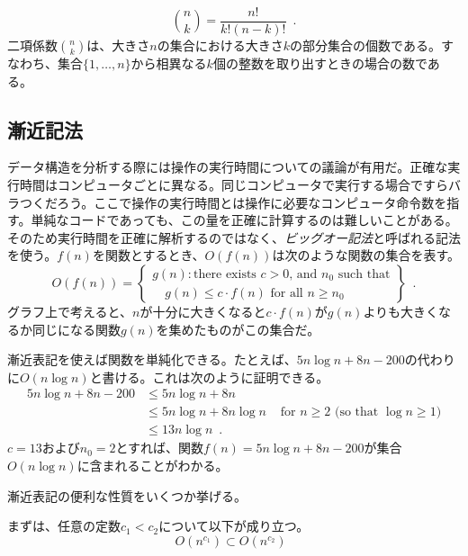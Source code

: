 \[
   \binom{n}{k} = \frac{n!}{k!(n-k)!} \enspace .
\]
二項係数$\binom{n}{k}$は、大きさ$n$の集合における大きさ$k$の部分集合の個数である。すなわち、集合$\{1,\ldots,n\}$から相異なる$k$個の整数を取り出すときの場合の数である。 %

\subsection{漸近記法}

  
データ構造を分析する際には操作の実行時間についての議論が有用だ。正確な実行時間はコンピュータごとに異なる。同じコンピュータで実行する場合ですらバラつくだろう。ここで操作の実行時間とは操作に必要なコンピュータ命令数を指す。単純なコードであっても、この量を正確に計算するのは難しいことがある。そのため実行時間を正確に解析するのではなく、\emph{ビッグオー記法}と呼ばれる記法を使う。$f(n)$を関数とするとき、$O(f(n))$は次のような関数の集合を表す。
\[
   O(f(n)) = \left\{
     \begin{array}{l}
       g(n):\mbox{there exists $c>0$, and $n_0$ such that} \\
             \quad\mbox{$g(n) \le c\cdot f(n)$ for all $n\ge n_0$}
     \end{array} \right\} \enspace .
\]
グラフ上で考えると、$n$が十分に大きくなると$c\cdot f(n)$が$g(n)$よりも大きくなるか同じになる関数$g(n)$を集めたものがこの集合だ。 %

漸近表記を使えば関数を単純化できる。たとえば、$5n\log n + 8n - 200$の代わりに$O(n \log n)$と書ける。これは次のように証明できる。
\begin{align*} 
       5n\log n + 8n - 200
        & \le 5n\log n + 8n \\
        & \le 5n\log n + 8n\log n & \mbox{ for $n\ge 2$ (so that $\log n \ge 1$)}
            \\
        & \le 13n\log n  \enspace .
\end{align*}
$ c = 13 $および$ n_0 = 2 $とすれば、関数$ f(n)= 5n \log n + 8n-200 $が集合$ O(n \log n)$に含まれることがわかる。

漸近表記の便利な性質をいくつか挙げる。

まずは、任意の定数$c_1 < c_2$について以下が成り立つ。
\[ O(n^{c_1}) \subset O(n^{c_2}) \enspace\]

